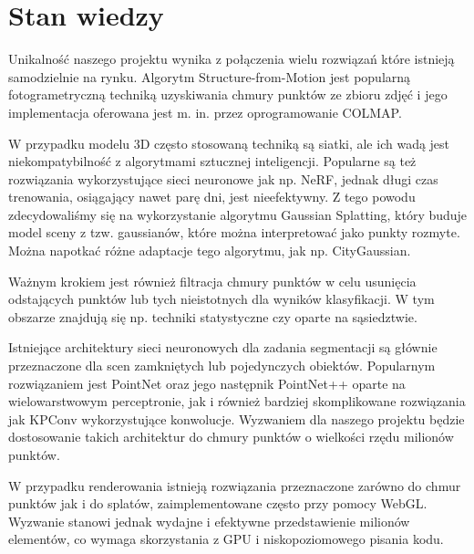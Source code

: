 \section{Stan wiedzy}

Unikalność naszego projektu wynika z połączenia wielu rozwiązań które istnieją samodzielnie na rynku. Algorytm Structure-from-Motion jest popularną fotogrametryczną techniką uzyskiwania chmury punktów ze zbioru zdjęć i jego implementacja oferowana jest m. in. przez oprogramowanie COLMAP. 

W przypadku modelu 3D często stosowaną techniką są siatki, ale ich wadą jest niekompatybilność z algorytmami sztucznej inteligencji. Popularne są też rozwiązania wykorzystujące sieci neuronowe jak np. NeRF\cite{mildenhall2020nerfrepresentingscenesneural}, jednak długi czas trenowania, osiągający nawet parę dni, jest nieefektywny. Z tego powodu zdecydowaliśmy się na wykorzystanie algorytmu Gaussian Splatting\cite{kerbl3Dgaussians}, który buduje model sceny z tzw. gaussianów, które można interpretować jako punkty rozmyte. Można napotkać różne adaptacje tego algorytmu, jak np. CityGaussian\cite{liu2024citygaussian}.

Ważnym krokiem jest również filtracja chmury punktów w celu usunięcia odstających punktów lub tych nieistotnych dla wyników klasyfikacji. W tym obszarze znajdują się np. techniki statystyczne czy oparte na sąsiedztwie. 

Istniejące architektury sieci neuronowych dla zadania segmentacji są głównie przeznaczone dla scen zamkniętych lub pojedynczych obiektów. Popularnym rozwiązaniem jest PointNet\cite{qi2016pointnet} oraz jego następnik PointNet++\cite{qi2017pointnetdeephierarchicalfeature} oparte na wielowarstwowym perceptronie, jak i również bardziej skomplikowane rozwiązania jak KPConv\cite{thomas2019kpconvflexibledeformableconvolution} wykorzystujące konwolucje. Wyzwaniem dla naszego projektu będzie dostosowanie takich architektur do chmury punktów o wielkości rzędu milionów punktów.  

W przypadku renderowania istnieją rozwiązania przeznaczone zarówno do chmur punktów jak i do splatów, zaimplementowane często przy pomocy WebGL. Wyzwanie stanowi jednak wydajne i efektywne przedstawienie milionów elementów, co wymaga skorzystania z GPU i niskopoziomowego pisania kodu. 

